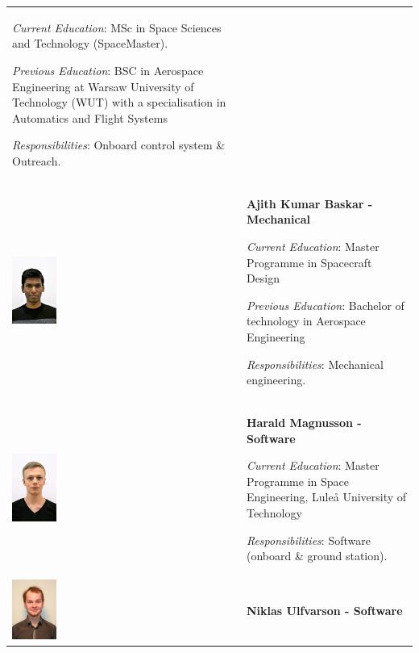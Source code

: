 \begin{longtable}[]{m{} m{}}
\smallskip
\textit{Current Education}: MSc in Space Sciences and Technology (SpaceMaster).

\smallskip
\textit{Previous Education}: BSC in Aerospace Engineering at Warsaw University of Technology (WUT) with a specialisation in Automatics and Flight Systems

\smallskip
\textit{Responsibilities}: Onboard control system \& Outreach.
\bigskip
\\

\includegraphics[width=0.2\textwidth]{0-cover/img/TEAMPICS/Ajith_final.jpg}  & \textbf{Ajith Kumar Baskar - Mechanical}

\smallskip
\textit{Current Education}: Master Programme in Spacecraft Design

\smallskip
\textit{Previous Education}: Bachelor of technology in Aerospace Engineering

\smallskip
\textit{Responsibilities}: Mechanical engineering.
\bigskip
\\

\includegraphics[width=0.2\textwidth]{0-cover/img/TEAMPICS/Harald_final.jpg}  & \textbf{Harald Magnusson - Software}

\smallskip
\textit{Current Education}: Master Programme in Space Engineering, Luleå University of Technology

\smallskip
\textit{Responsibilities}: Software (onboard \& ground station).
\bigskip
\\

\includegraphics[width=0.2\textwidth]{0-cover/img/TEAMPICS/Niklas_final.jpg}  & \textbf{Niklas Ulfvarson - Software}


\end{longtable}
